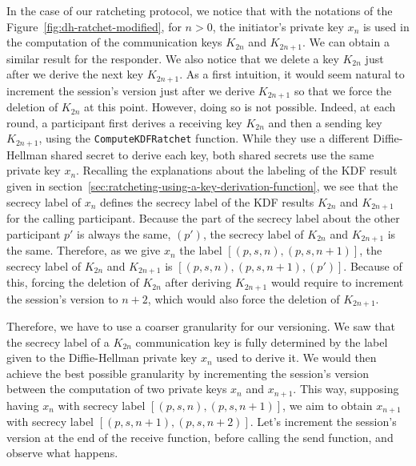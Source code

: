 In the case of our ratcheting protocol, we notice that with the notations of the Figure~\ref{fig:dh-ratchet-modified}, for $n>0$, the initiator's private key $x_n$ is used in the computation of the communication keys $K_{2n}$ and $K_{2n+1}$. We can obtain a similar result for the responder.
We also notice that we delete a key $K_{2n}$ just after we derive the next key $K_{2n+1}$.
As a first intuition, it would seem natural to increment the session's version just after we derive $K_{2n+1}$ so that we force the deletion of $K_{2n}$ at this point.
However, doing so is not possible.
Indeed, at each round, a participant first derives a receiving key $K_{2n}$ and then a sending key $K_{2n+1}$, using the \texttt{ComputeKDFRatchet} function.
While they use a different Diffie-Hellman shared secret to derive each key, both shared secrets use the same private key $x_n$.
Recalling the explanations about the labeling of the KDF result given in section~\ref{sec:ratcheting-using-a-key-derivation-function}, we see that the secrecy label of $x_{n}$ defines the secrecy label of the KDF results $K_{2n}$ and $K_{2n+1}$ for the calling participant.
Because the part of the secrecy label about the other participant $p'$ is always the same, $(p')$, the secrecy label of $K_{2n}$ and $K_{2n+1}$ is the same.
Therefore, as we give $x_{n}$ the label $[(p,s,n),(p,s,n+1)]$, the secrecy label of $K_{2n}$ and $K_{2n+1}$ is $[(p,s,n),(p,s,n+1),(p')]$.
Because of this, forcing the deletion of $K_{2n}$ after deriving $K_{2n+1}$ would require to increment the session's version to $n+2$, which would also force the deletion of $K_{2n+1}$.

Therefore, we have to use a coarser granularity for our versioning.
We saw that the secrecy label of a $K_{2n}$ communication key is fully determined by the label given to the Diffie-Hellman private key $x_{n}$ used to derive it.
We would then achieve the best possible granularity by incrementing the session's version between the computation of two private keys $x_{n}$ and $x_{n+1}$.
This way, supposing having $x_{n}$ with secrecy label $[(p,s,n),(p,s,n+1)]$, we aim to obtain $x_{n+1}$ with secrecy label $[(p,s,n+1),(p,s,n+2)]$.
Let's increment the session's version at the end of the receive function, before calling the send function, and observe what happens.

